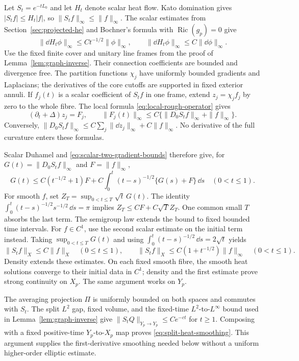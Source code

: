 Let $S_t=e^{-tL_0}$ and let $H_t$ denote scalar heat flow.
Kato domination gives $|S_tf|\le H_t|f|$, so
$\|S_tf\|_\infty\le\|f\|_\infty$.
The scalar estimates from Section~\ref{sec:projected-he} and
Bochner's formula with $\operatorname{Ric}(g_p)=0$ give
\begin{equation}\label{eq:scalar-two-gradient-bounds}
 \|\dd H_t\phi\|_\infty\le Ct^{-1/2}\|\phi\|_\infty,
 \qquad
 \|\dd H_t\phi\|_\infty\le C\|\dd\phi\|_\infty.
\end{equation}
Use the fixed finite cover and unitary line frames from
the proof of Lemma~\ref{lem:graph-inverse}. Their connection
coefficients are bounded and divergence free. The partition
functions $\chi_j$ have uniformly bounded gradients and
Laplacians; the derivatives of the core cutoffs are supported
in fixed exterior annuli. If $f_j(t)$ is a scalar coefficient
of $S_tf$ in one frame, extend $z_j=\chi_jf_j$ by zero
to the whole fibre. The local formula
\eqref{eq:local-rough-operator} gives
\[
 (\partial_t+\Delta)z_j=F_j,
 \qquad \|F_j(t)\|_\infty
       \le C\{\|D_0S_tf\|_\infty+\|f\|_\infty\}.
\]
Conversely,
$\|D_0S_tf\|_\infty\le C\sum_j\|\dd z_j\|_\infty+C\|f\|_\infty$.
No derivative of the full curvature enters these formulas.

Scalar Duhamel and \eqref{eq:scalar-two-gradient-bounds}
therefore give, for $G(t)=\|D_0S_tf\|_\infty$ and
$F=\|f\|_\infty$,
\[
 G(t)\le C(t^{-1/2}+1)F+
      C\int_0^t(t-s)^{-1/2}\{G(s)+F\}\,\dd s
                       \quad(0<t\le1).
\]
For smooth $f$, set $Z_T=\sup_{0<t\le T}\sqrt t\,G(t)$.
The identity
$\int_0^t(t-s)^{-1/2}s^{-1/2}\,\dd s=\pi$
implies $Z_T\le CF+C\sqrt T Z_T$. One common small
$T$ absorbs the last term. The semigroup law extends the
bound to fixed bounded time intervals. For $f\in C^1$,
use the second scalar estimate on the initial term instead.
Taking $\sup_{0<t\le T}G(t)$ and using
$\int_0^t(t-s)^{-1/2}\,\dd s=2\sqrt t$ yields
\[
 \|S_tf\|_X\le C\|f\|_X\quad(0\le t\le1),\qquad
 \|S_tf\|_X\le C(1+t^{-1/2})\|f\|_\infty\quad(0<t\le1).
\]
Density extends these estimates. On each fixed smooth fibre,
the smooth heat solutions converge to their initial data in
$C^1$; density and the first estimate prove strong continuity
on $X_p$. The same argument works on $Y_p$.

The averaging projection $\Pi$ is uniformly bounded on both
spaces and commutes with $S_t$. The split $L^2$ gap, fixed
volume, and the fixed-time $L^2$-to-$L^\infty$ bound used in
Lemma~\ref{lem:graph-inverse} give
$\|S_tQ\|_{Y_p\to Y_p}\le Ce^{-ct}$ for $t\ge1$.
Composing with a fixed positive-time $Y_p$-to-$X_p$ map
proves \eqref{eq:split-heat-smoothing}. This argument supplies
the first-derivative smoothing needed below without a
uniform higher-order elliptic estimate.

